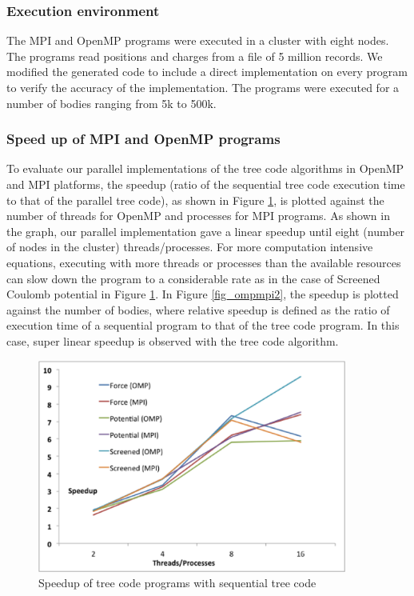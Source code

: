 \documentclass[draftclsnofoot]{elsarticle}
\begin{document}
\subsubsection{Execution environment}
The MPI and OpenMP programs were executed in a cluster with eight nodes. The programs read positions and charges from a file of 5 million records. We modified the generated
code to include a direct implementation on every program to verify the accuracy of the implementation. The programs were executed for a number of bodies ranging from 5k to 500k.
  
\subsubsection{Speed up of MPI and OpenMP programs}
To evaluate our parallel implementations of the tree code algorithms in  OpenMP and MPI platforms, the speedup (ratio of the sequential tree code execution time to that of the
parallel tree code), as shown in Figure \ref{fig_ompmpi1}, is plotted against the number of threads for OpenMP and processes for MPI programs. As shown in the graph, 
our parallel implementation gave a linear speedup until eight (number of nodes in the cluster) threads/processes. For more computation intensive equations, 
executing with more threads or processes than the available resources can slow down the program to a considerable rate as in the case of 
Screened Coulomb potential in Figure \ref{fig_ompmpi1}. 
In Figure \ref{fig_ompmpi2}, the speedup is plotted against 
the number of bodies, where relative speedup is defined as the ratio of execution time of a sequential program to that of the tree code program. 
In this case, super linear speedup is observed with the tree code algorithm. 

\begin{figure}[!t]
\centering
\includegraphics[width=4.0in]{ompmpi1.eps}
\caption{Speedup of tree code programs with sequential tree code}
\label{fig_ompmpi1}
\end{figure}
\end{document}
